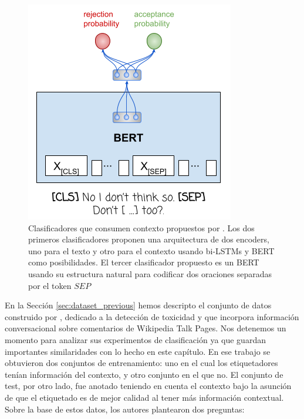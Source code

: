 \begin{figure}[t]
    \begin{minipage}[b]{0.35\textwidth}
        \includegraphics[width=\textwidth]{img/pavlopoulos_bert_sep_classifier.png}
    \end{minipage}


    \caption{Clasificadores que consumen contexto propuestos por \citet{pavlopoulos2020toxicity}. Los dos primeros clasificadores proponen una arquitectura de dos encoders, uno para el texto y otro para el contexto usando bi-LSTMs y BERT como posibilidades. El tercer clasificador propuesto es un BERT usando su estructura natural para codificar dos oraciones separadas por el token $SEP$ }
    \label{fig:pavlopoulos_classifiers}
\end{figure}


En la Sección \ref{sec:dataset_previous} hemos descripto el conjunto de datos construido por \citet{pavlopoulos2020toxicity}, dedicado a la detección de toxicidad y que incorpora información conversacional sobre comentarios de Wikipedia Talk Pages. Nos detenemos un momento para analizar sus experimentos de clasificación ya que guardan importantes similaridades con lo hecho en este capítulo. En ese trabajo se obtuvieron dos conjuntos de entrenamiento: uno en el cual los etiquetadores tenían información del contexto, y otro conjunto en el que no. El conjunto de test, por otro lado, fue anotado teniendo en cuenta el contexto bajo la asunción de que el etiquetado es de mejor calidad al tener más información contextual. Sobre la base de estos datos, los autores plantearon dos preguntas:

